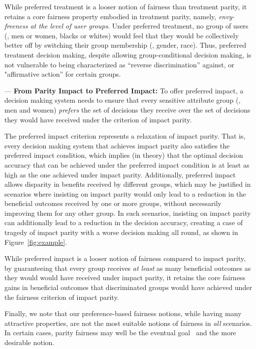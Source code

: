 \documentclass{article}
\begin{document}
While preferred treatment is a looser notion of fairness than treatment parity, it retains a core fairness property embodied in treatment parity, namely, {\it envy-freeness at
the level of user groups}. Under preferred treatment, no group of users (\eg, men or women, blacks or whites) would feel that they would be collectively better off by switching their
group membership (\eg, gender, race). Thus, preferred treatment decision making, despite allowing group-conditional decision making, is not vulnerable to being characterized
as ``reverse discrimination'' against, or "affirmative action'' for certain groups.

\noindent
{\hspace{0.3mm}--- \bf From Parity Impact to Preferred Impact:} To offer preferred impact, a decision making system needs to ensure that every sensitive attribute group (\eg, men and
women) {\it prefers} the set of decisions they receive over the set of decisions they would have received under the criterion of impact parity.

The preferred impact criterion represents a relaxation of impact parity. That is, every decision making system that achieves impact parity also satisfies the preferred
impact condition,
which implies (in theory) that the optimal decision accuracy that can be achieved under the preferred impact condition is at least as high as the one achieved under impact parity.
Additionally, preferred impact allows disparity in benefits received by different groups, which may be justified in scenarios where insisting on
impact parity would only lead to a reduction in the beneficial outcomes received by one or more groups, without necessarily improving them for any
other group.
In such scenarios, insisting on impact parity can additionally lead to a reduction in the decision accuracy, creating a case of tragedy of impact parity with a
worse decision making all round, as shown in Figure~\ref{fig:example}.

While preferred impact is a looser notion of fairness compared to impact parity, by guaranteeing that every group receives {\it at least} as many beneficial
outcomes as they would would have received under impact parity, it retains the core fairness gains in beneficial outcomes that discriminated groups would
have achieved under the fairness criterion of impact parity.


Finally, we note that our preference-based fairness notions, while having many attractive properties, are not the most suitable notions of fairness in \textit{all} scenarios. In certain cases, parity fairness may well be the eventual goal~\cite{plato-disc} and the more desirable notion.
\end{document}
